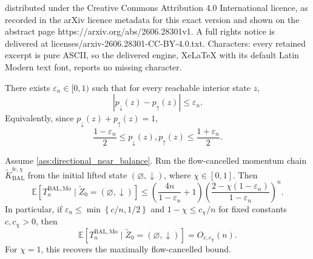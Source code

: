 \documentclass[10pt,a4paper]{amsart}
\newcommand{\abs}[1]{\left| #1\right|}
\newcommand{\bbE}{\mathbb{E}}
\newcommand{\lbra}[1]{\left[#1\right]}
\newcommand{\mbra}[1]{\left\{#1\right\}}
\newcommand{\sbra}[1]{\left(#1\right)}
\begin{document}
distributed under the Creative Commons Attribution 4.0 International licence, as recorded in the arXiv licence metadata for this exact version and shown on the abstract page https://arxiv.org/abs/2606.28301v1. A full rights notice is delivered at licenses/arxiv-2606.28301-CC-BY-4.0.txt. Characters: every retained excerpt is pure ASCII, so the delivered engine, XeLaTeX with its default Latin Modern text font, reports no missing character.
\begin{assumption}
\label{ass:directional_near_balance}
There exists $\varepsilon_n\in[0,1)$ such that for every reachable interior state $z$,
\begin{equation*}
    \abs{p_{\downarrow}(z)-p_{\uparrow}(z)}\le \varepsilon_n.
\end{equation*}
Equivalently, since $p_{\downarrow}(z)+p_{\uparrow}(z)=1$,
\begin{equation*}
    \frac{1-\varepsilon_n}{2}\le p_{\downarrow}(z),p_{\uparrow}(z)\le \frac{1+\varepsilon_n}{2}.
\end{equation*}
\end{assumption}

\begin{theorem}
\label{thm:robust_flow_cancelled_hitting}
Assume \cref{ass:directional_near_balance}. Run the flow-cancelled momentum
chain $\widetilde K_{\mathrm{BAL}}^{\mathrm{fc},\chi}$ from the initial
lifted state $(\varnothing,\downarrow)$, where $\chi\in[0,1]$. Then
\begin{equation*}
    \bbE\lbra{
        T_n^{\mathrm{BAL,Mo}}
        \mid
        \widetilde Z_0=(\varnothing,\downarrow)
    }
    \le
    \sbra{
        \frac{4n}{1-\varepsilon_n}+1
    }
    \sbra{
        \frac{2-\chi(1-\varepsilon_n)}
             {1-\varepsilon_n}
    }^n .
\end{equation*}
In particular, if $\varepsilon_n\le \min\mbra{c/n,1/2}$ and
$1-\chi\le c_\chi/n$ for fixed constants $c,c_\chi>0$, then
\begin{equation*}
    \bbE\lbra{
        T_n^{\mathrm{BAL,Mo}}
        \mid
        \widetilde Z_0=(\varnothing,\downarrow)
    }
    =
    O_{c,c_\chi}(n).
\end{equation*}
For $\chi=1$, this recovers the maximally flow-cancelled bound.
\end{theorem}
\end{document}
